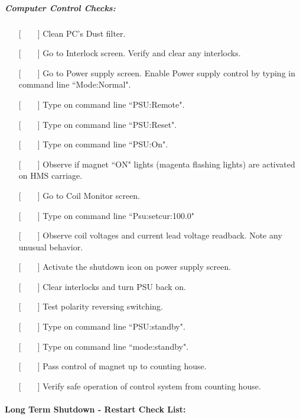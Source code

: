 {\subparagraph{Computer Control Checks:}

\begin{itemize}
\item[{[~~~~]}]{Clean PC's Dust filter.}
\item[{[~~~~]}]{Go to Interlock screen. Verify and clear any interlocks.}
\item[{[~~~~]}]{Go to Power supply screen. Enable Power supply control by
typing in command line ``Mode:Normal".}
\item[{[~~~~]}]{Type on command line ``PSU:Remote".}
\item[{[~~~~]}]{Type on command line ``PSU:Reset".}
\item[{[~~~~]}]{Type on command line ``PSU:On".}
\item[{[~~~~]}]{Observe if magnet ``ON" lights (magenta flashing lights) are
activated on HMS carriage.}
\item[{[~~~~]}]{Go to Coil Monitor screen.}
\item[{[~~~~]}]{Type on command line ``Psu:setcur:100.0"}
\item[{[~~~~]}]{Observe coil voltages and current lead voltage readback. Note
any unusual behavior.}
\item[{[~~~~]}]{Activate the shutdown icon on power supply screen.}
\item[{[~~~~]}]{Clear interlocks and turn PSU back on.}
\item[{[~~~~]}]{Test polarity reversing switching.}
\item[{[~~~~]}]{Type on command line ``PSU:standby".}
\item[{[~~~~]}]{Type on command line ``mode:standby".}
\item[{[~~~~]}]{Pass control of magnet up to counting house.}
\item[{[~~~~]}]{Verify safe operation of control system from counting house.}
\end{itemize}

\vspace{0.5in}
\hspace*{3.5in}{\underline{~~~~~~~~~~~~~~~~~~~~~~~~~~~~~~~~~}}
\newline
\hspace*{3.5in}{Signature~~~~~~~~~~~~Date}


\newpage
\paragraph{Long Term Shutdown - Restart Check List:}

}
